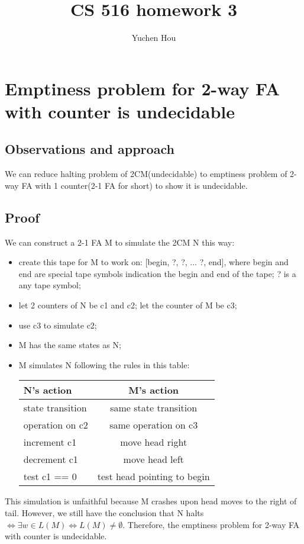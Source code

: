 \documentclass{article}
\begin{document}
\lstset{language=python, tabsize=4}
\title{CS 516 homework 3}
\author{Yuchen Hou}
\maketitle

\section{Emptiness problem for 2-way FA with counter is undecidable}

\subsection{Observations and approach}
We can reduce halting problem of 2CM(undecidable) to emptiness problem of 2-way FA with 1 counter(2-1 FA for short) to show it is undecidable.

\subsection{Proof}
We can construct a 2-1 FA M to simulate the 2CM N this way:
\begin{itemize}
	\item create this tape for M to work on: [begin, ?, ?, ... ?, end], where begin and end are special tape symbols indication the begin and end of the tape; ? is a any tape symbol;
	\item let 2 counters of N be c1 and c2; let the counter of M be c3;
	\item use c3 to simulate c2;
	\item M has the same states as N;
	\item M simulates N following the rules in this table:
		
	\begin{tabularx}{0.5\textwidth}{|X|c|}  \hline
		 N's action & M's action \\ \hline
		 state transition & same state transition \\ \hline
		 operation on c2 & same operation on c3 \\ \hline
		 increment c1 & move head right \\ \hline
		 decrement c1 & move head left \\ \hline
		 test c1 == 0 & test head pointing to begin \\ \hline
	\end{tabularx}
\end{itemize}
This simulation is unfaithful because M crashes upon head moves to the right of tail. However, we still have the conclusion that N halts $ \iff \exists w \in L(M) \iff L(M) \neq \emptyset$. Therefore, the emptiness problem for 2-way FA with counter is undecidable.
\end{document}
